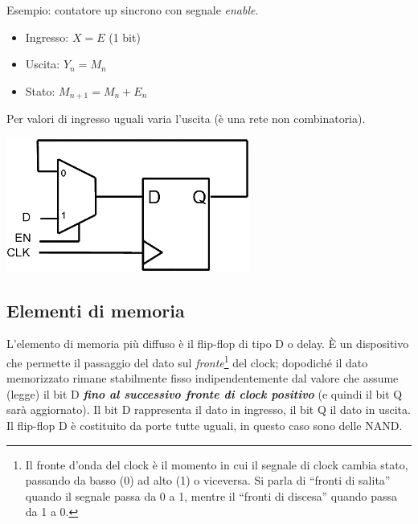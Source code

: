 \documentclass[
]{book}
\begin{document}
\begin{bluebox}{Esempio: contatore up sincrono con segnale \emph{enable}.}
\begin{itemize}
\item Ingresso: $X=E$ (1 bit)
\item Uscita: $Y_{n}=M_{n}$
\item Stato: $M_{n+1}=M_{n}+E_{n}$
\end{itemize}
Per valori di ingresso uguali varia l'uscita (è una rete non combinatoria).
\begin{center}
\begin{minipage}[c]{0.6\linewidth}
\vspace*{0pt}
\centering
\includegraphics[width=0.6\textwidth]{assets/imgs/contatore_up.png}
\label{fig:fig1}
\end{minipage}
\end{center}
\end{bluebox}

\subsection{Elementi di memoria}\label{elementi-di-memoria}

L'elemento di memoria più diffuso è il flip-flop di tipo D o delay. È un
dispositivo che permette il passaggio del dato sul
\emph{fronte}\footnote{Il fronte d'onda del clock è il momento in cui il
  segnale di clock cambia stato, passando da basso (0) ad alto (1) o
  viceversa. Si parla di ``fronti di salita'' quando il segnale passa da
  0 a 1, mentre il ``fronti di discesa'' quando passa da 1 a 0.} del
clock; dopodiché il dato memorizzato rimane stabilmente fisso
indipendentemente dal valore che assume (legge) il bit D
\textbf{\emph{fino al successivo fronte di clock positivo}} (e quindi il
bit Q sarà aggiornato). Il bit D rappresenta il dato in ingresso, il bit
Q il dato in uscita. Il flip-flop D è costituito da porte tutte uguali,
in questo caso sono delle NAND.
\end{document}
